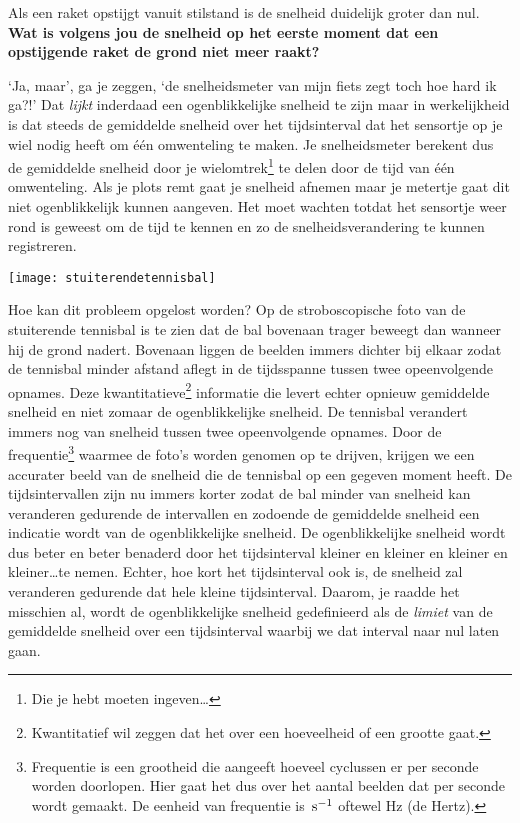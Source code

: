\documentclass{ximera}
\begin{document}
\begin{denkvraag*}{}
Als een raket opstijgt vanuit stilstand is de snelheid duidelijk groter dan nul. \textbf{Wat is volgens jou de snelheid op het eerste moment dat een opstijgende raket de grond niet meer raakt?}
\end{denkvraag*}


`Ja, maar', ga je zeggen, `de snelheidsmeter van mijn fiets zegt toch hoe hard ik ga?!' Dat \textit{lijkt} inderdaad een ogenblikkelijke snelheid te zijn maar in werkelijkheid is dat steeds de gemiddelde snelheid over het tijdsinterval dat het sensortje op je wiel nodig heeft om één omwenteling te maken. Je snelheidsmeter berekent dus de gemiddelde snelheid door je wielomtrek\footnote{Die je hebt moeten ingeven\ldots} te delen door de tijd van één omwenteling. Als je plots remt gaat je snelheid afnemen maar je metertje gaat dit niet ogenblikkelijk kunnen aangeven. Het moet wachten totdat het sensortje weer rond is geweest om de tijd te kennen en zo de snelheidsverandering te kunnen registreren.
\begin{image}

\texttt{[image: stuiterendetennisbal]}
\end{image}

Hoe kan dit probleem opgelost worden? Op de stroboscopische foto van de stuiterende tennisbal is te zien dat de bal bovenaan trager beweegt dan wanneer hij de grond nadert. Bovenaan liggen de beelden immers dichter bij elkaar zodat de tennisbal minder afstand aflegt in de tijdsspanne tussen twee opeenvolgende opnames. 
Deze kwantitatieve\footnote{Kwantitatief wil zeggen dat het over een hoeveelheid of een grootte gaat.} informatie die levert echter opnieuw gemiddelde snelheid en niet zomaar de ogenblikkelijke snelheid. De tennisbal verandert immers nog van snelheid tussen twee opeenvolgende opnames. Door de frequentie\footnote{Frequentie is een grootheid die aangeeft hoeveel cyclussen er per seconde worden doorlopen. Hier gaat het dus over het aantal beelden dat per seconde wordt gemaakt. De eenheid van frequentie is $\rm\,s^{-1}$ oftewel Hz (de Hertz).} waarmee de foto's worden genomen op te drijven, krijgen we een accurater beeld van de snelheid die de tennisbal op een gegeven moment heeft. De tijdsintervallen zijn nu immers korter zodat de bal minder van snelheid kan veranderen gedurende de intervallen en zodoende de gemiddelde snelheid een indicatie wordt van de ogenblikkelijke snelheid. De ogenblikkelijke snelheid wordt dus beter en beter benaderd door het tijdsinterval kleiner en kleiner en kleiner en kleiner\ldots te nemen. Echter, hoe kort het tijdsinterval ook is, de snelheid zal veranderen gedurende dat hele kleine tijdsinterval. Daarom, je raadde het misschien al, wordt de ogenblikkelijke snelheid gedefinieerd als de \emph{limiet} van de gemiddelde snelheid over een tijdsinterval waarbij we dat interval naar nul laten gaan. 
\end{document}
